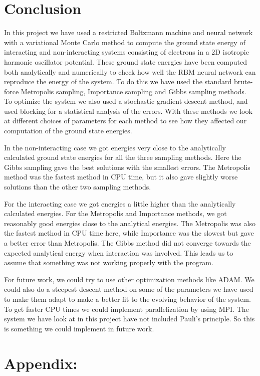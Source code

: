 \documentclass[12pt,a4paper,english]{article}
\begin{document}
\section{Conclusion}
\label{sect:Conclusion}
In this project we have used a restricted Boltzmann machine and neural network with a variational Monte Carlo method to compute the ground state energy of interacting and non-interacting systems consisting of electrons in a 2D isotropic harmonic oscillator potential. These ground state energies have been computed both analytically and numerically to check how well the RBM neural network can reproduce the energy of the system. To do this we have used the standard brute-force Metropolis sampling, Importance sampling and Gibbs sampling methods. To optimize the system we also used a stochastic gradient descent method, and used blocking for a statistical analysis of the errors. With these methods we look at different choices of parameters for each method to see how they affected our computation of the ground state energies.

In the non-interacting case we got energies very close to the analytically calculated ground state energies for all the three sampling methods. Here the Gibbs sampling gave the best solutions with the smallest errors. The Metropolis method was the fastest method in CPU time, but it also gave slightly worse solutions than the other two sampling methods.

For the interacting case we got energies a little higher than the analytically calculated energies. For the Metropolis and Importance methods, we got reasonably good energies close to the analytical energies. The Metropolis was also the fastest method in CPU time here, while Importance was the slowest but gave a better error than Metropolis. The Gibbs method did not converge towards the expected analytical energy when interaction was involved. This leads us to assume that something was not working properly with the program.

For future work, we could try to use other optimization methods like ADAM. We could also do a steepest descent method on some of the parameters we have used to make them adapt to make a better fit to the evolving behavior of the system. To get faster CPU times we could implement parallelization by using MPI. The system we have look at in this project have not included Pauli's principle. So this is something we could implement in future work.

\appendix
\section*{Appendix:}
\end{document}
